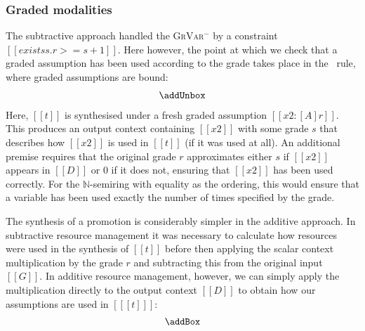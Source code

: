\subsubsection{Graded modalities}
The subtractive approach handled the \textsc{GrVar$^{-}$}
by a constraint $[[ exists s . r >= s + 1]]$. Here however, the
point at which we check that a graded assumption has been used
according to the grade takes place in the \addUnboxName\ rule, where graded
assumptions are bound:
%
\begin{align*}
  \addUnbox
  \end{align*}
%
Here, $[[t]]$ is synthesised under a fresh graded assumption $[[ x2 : [A] r]]$.
This produces an output context containing $[[x2]]$ with some grade $s$ that
describes how $[[x2]]$ is used in $[[t]]$ (if it was used at all). An additional
premise requires that the original grade $r$ approximates either $s$ if $[[x2]]$
appears in $[[D]]$ or $0$ if it does not, ensuring that $[[x2]]$ has been used
correctly. For the $\mathbb{N}$-semiring with equality as the ordering, this
would ensure that a variable has been used exactly the number of times specified
by the grade.

The synthesis of a promotion is considerably simpler in the additive
approach. In subtractive resource management it was necessary to calculate how
resources were used in the synthesis of $[[t]]$ before then applying the
scalar context multiplication by the grade $r$ and subtracting this from the
original input $[[G]]$. In additive resource management, however, we can simply
apply the multiplication directly to the output context $[[D]]$ to obtain how
our assumptions are used in $[[ [t] ]]$:
%
\begin{align*}
  \addBox
\end{align*}

